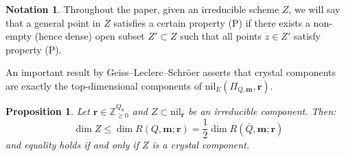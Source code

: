 \documentclass[a4paper,12pt]{article}
\theoremstyle{definition}
\newtheorem{notation}[definition]{Notation}
\theoremstyle{plain}
\newtheorem{proposition}[definition]{Proposition}
\theoremstyle{remark}
\newcommand\bbZ{\mathbb{Z}}
\newcommand\bfm{\mathbf{m}}
\newcommand\bfr{\mathbf{r}}
\begin{document}
\begin{notation}
Throughout the paper, given an irreducible scheme $Z$, we will say that a general point in $Z$ satisfies a certain property (P) if there exists a non-empty (hence dense) open subset $Z'\subset Z$ such that all points $z\in Z'$ satisfy property (P).
\end{notation}

An important result by Geiss--Leclerc--Schr\"{o}er asserts that crystal components are exactly the top-dimensional components of $\mathrm{nil}_E(\Pi_{Q,\bfm},\bfr)$.

\begin{proposition}\label{Prop/dimCrystalComponents}
\emph{\cite[Thm.\ 4.1, Prop.\ 4.4]{GLS18a}}
Let $\bfr\in\bbZ_{\geq0}^{Q_0}$ and $Z\subset \mathrm{nil}_{\bfr}$ be an irreducible component. Then:
\[
\dim Z\leq\dim R(Q,\bfm;\bfr)=\frac{1}{2}\dim R(\overline{Q},\bfm;\bfr)
\]
and equality holds if and only if $Z$ is a crystal component.
\end{proposition}
\end{document}
